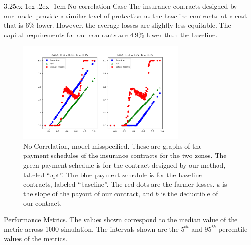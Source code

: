 \documentclass[11pt]{article}
\makeatletter
\renewcommand\paragraph{\@startsection{paragraph}{5}{\z@}%
  {3.25ex \@plus1ex \@minus.2ex}%
  {-1em}%
  {\normalfont\normalsize\bfseries}}
\makeatother
\begin{document}
        \paragraph{No correlation Case} The insurance contracts designed by our model provide a similar level of protection as the baseline contracts, at a cost that is $6\%$ lower. However, the average losses are slightly less equitable. The capital requirements for our contracts are $4.9\%$ lower than the baseline. 
        \begin{figure}[H]
            \centering
            \includegraphics[width=0.75\textwidth]{../../output/figures/Logit_Bootstrap/no_corr_nonlinear_premium.png}
            \caption{No Correlation, model misspecified. These are graphs of the payment schedules of the insurance contracts for the two zones. The green payment schedule is for the contract designed by our method, labeled ``opt''. The blue payment schedule is for the baseline contracts, labeled ``baseline''. The red dots are the farmer losses. $a$ is the slope of the payout of our contract, and $b$ is the deductible of our contract.}
        \end{figure}

        \begin{table}[H]
            \centering
            
            
            \caption{Performance Metrics. The values shown correspond to the median value of the metric across 1000 simulation. The intervals shown are the $5^{th}$ and $95^{th}$ percentile values of the metrics.}
        \end{table}
        \FloatBarrier
\end{document}
